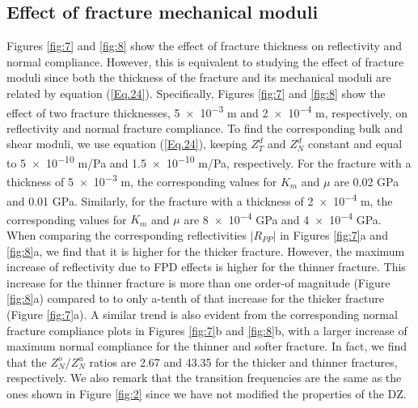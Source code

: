 \documentclass[draft]{agujournal2019}
\begin{document}
\subsection{Effect of fracture mechanical  moduli}
Figures \ref{fig:7} and \ref{fig:8} show the effect of fracture thickness on reflectivity and normal compliance. However, this is equivalent to studying the effect of fracture moduli since both the thickness of the fracture and its mechanical moduli are related by equation (\ref{Eq.24}). Specifically, Figures \ref{fig:7} and \ref{fig:8} show the effect of two fracture thicknesses, \num{5e-3} m and \num{2e-4} m, respectively, on reflectivity and normal fracture compliance. To find the corresponding bulk and shear moduli, we use equation (\ref{Eq.24}), keeping  $Z_T^d$ and $Z_N^d$ constant and equal to 
\num{5e-10} m/Pa and \num{1.5e-10} m/Pa, respectively. For the fracture with a  thickness of \num{5e-3} m, the corresponding values for $K_m$ and $\mu$ are 0.02 GPa and 0.01 GPa. Similarly, for the fracture  with a thickness of \num{2e-4} m, the corresponding values for $K_m$ and $\mu$ are  \num{8e-4} GPa and  \num{4e-4} GPa. When comparing the corresponding reflectivities $|R_{PP}|$ in Figures \ref{fig:7}a and \ref{fig:8}a, we find that it is higher for the thicker fracture. However, the maximum increase of reflectivity due to FPD effects is higher for the thinner fracture. This increase for the thinner fracture is more than one order-of magnitude (Figure \ref{fig:8}a) compared to to only a-tenth of that increase for the thicker fracture (Figure \ref{fig:7}a). 
A similar trend is also evident from the corresponding  normal fracture compliance plots in Figures \ref{fig:7}b and \ref{fig:8}b, with a larger increase of maximum normal compliance for the thinner and softer fracture. In fact, we find that the  $Z_N^o/Z_N^u$ ratios are 2.67 and 43.35 for the thicker and thinner fractures, respectively. We also remark that the transition frequencies are the same as the ones shown in Figure \ref{fig:2} since we have not modified the properties of the DZ.
\end{document}
